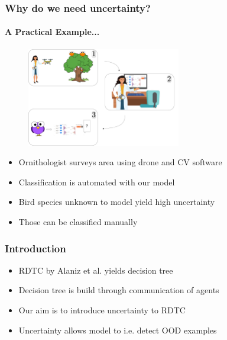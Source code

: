 \documentclass[9pt]{beamer}
\begin{document}
\begin{frame}
\frametitle{Why do we need uncertainty?}
\framesubtitle{A Practical Example...}
	\begin{figure}
		\centering
		\includegraphics[width=0.6\textwidth]{images/ornithology.pdf}
	\end{figure}
	\begin{itemize}%
	\item Ornithologist surveys area using drone and CV software
	\item Classification is automated with our model
	\item Bird species unknown to model yield high uncertainty
	\item Those can be classified manually
	\end{itemize}
\end{frame}

\begin{frame}
\frametitle{Introduction}
\begin{itemize}
	\item RDTC by Alaniz et al. \cite{alaniz2019explainable} yields decision tree
	\item Decision tree is build through communication of agents
	\item Our aim is to introduce uncertainty to RDTC
	\item Uncertainty allows model to i.e. detect OOD examples
\end{itemize}
\end{frame}
\end{document}
